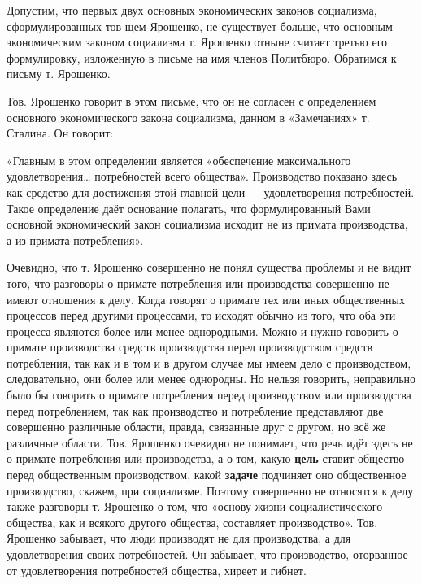 \documentclass[12pt, a4paper, openany]{book}
\begin{document}
Допустим, что первых двух основных экономических законов социализма, сформулированных тов-щем Ярошенко, не существует больше, что основным экономическим законом социализма т. Ярошенко отныне считает третью его формулировку, изложенную в письме на имя членов Политбюро. Обратимся к письму т. Ярошенко.



Тов. Ярошенко говорит в этом письме, что он не согласен с определением основного экономического закона социализма, данном в «Замечаниях» т. Сталина. Он говорит:



«Главным в этом определении является «обеспечение максимального удовлетворения… потребностей всего общества». Производство показано здесь как средство для достижения этой главной цели — удовлетворения потребностей. Такое определение даёт основание полагать, что формулированный Вами основной экономический закон социализма исходит не из примата производства, а из примата потребления».



Очевидно, что т. Ярошенко совершенно не понял существа проблемы и не видит того, что разговоры о примате потребления или производства совершенно не имеют отношения к делу. Когда говорят о примате тех или иных общественных процессов перед другими процессами, то исходят обычно из того, что оба эти процесса являются более или менее однородными. Можно и нужно говорить о примате производства средств производства перед производством средств потребления, так как и в том и в другом случае мы имеем дело с производством, следовательно, они более или менее однородны. Но нельзя говорить, неправильно было бы говорить о примате потребления перед производством или производства перед потреблением, так как производство и потребление представляют две совершенно различные области, правда, связанные друг с другом, но всё же различные области. Тов. Ярошенко очевидно не понимает, что речь идёт здесь не о примате потребления или производства, а о том, какую \textbf{цель} ставит общество перед общественным производством, какой \textbf{задаче} подчиняет оно общественное производство, скажем, при социализме. Поэтому совершенно не относятся к делу также разговоры т. Ярошенко о том, что «основу жизни социалистического общества, как и всякого другого общества, составляет производство». Тов. Ярошенко забывает, что люди производят не для производства, а для удовлетворения своих потребностей. Он забывает, что производство, оторванное от удовлетворения потребностей общества, хиреет и гибнет.
\end{document}
